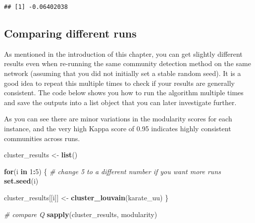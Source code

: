 \documentclass[
]{book}
\newenvironment{Shaded}{\begin{snugshade}}{\end{snugshade}}
\newcommand{\AttributeTok}[1]{\textcolor[rgb]{0.13,0.29,0.53}{#1}}
\newcommand{\CommentTok}[1]{\textcolor[rgb]{0.56,0.35,0.01}{\textit{#1}}}
\newcommand{\ConstantTok}[1]{\textcolor[rgb]{0.56,0.35,0.01}{#1}}
\newcommand{\ControlFlowTok}[1]{\textcolor[rgb]{0.13,0.29,0.53}{\textbf{#1}}}
\newcommand{\DecValTok}[1]{\textcolor[rgb]{0.00,0.00,0.81}{#1}}
\newcommand{\FunctionTok}[1]{\textcolor[rgb]{0.13,0.29,0.53}{\textbf{#1}}}
\newcommand{\NormalTok}[1]{#1}
\newcommand{\OtherTok}[1]{\textcolor[rgb]{0.56,0.35,0.01}{#1}}
\newcommand{\SpecialCharTok}[1]{\textcolor[rgb]{0.81,0.36,0.00}{\textbf{#1}}}
\begin{document}
\begin{Shaded}
\end{Shaded}

\begin{verbatim}
## [1] -0.06402038
\end{verbatim}

\subsection{Comparing different runs}\label{comparing-different-runs}

As mentioned in the introduction of this chapter, you can get slightly different results even when re-running the same community detection method on the same network (assuming that you did not initially set a stable random seed). It is a good idea to repeat this multiple times to check if your results are generally consistent. The code below shows you how to run the algorithm multiple times and save the outputs into a list object that you can later investigate further.

As you can see there are minor variations in the modularity scores for each instance, and the very high Kappa score of 0.95 indicates highly consistent communities across runs.

\begin{Shaded}
\begin{Highlighting}[]
\NormalTok{cluster\_results }\OtherTok{\textless{}{-}} \FunctionTok{list}\NormalTok{()}

\ControlFlowTok{for}\NormalTok{(i }\ControlFlowTok{in} \DecValTok{1}\SpecialCharTok{:}\DecValTok{5}\NormalTok{) \{ }\CommentTok{\# change 5 to a different number if you want more runs }
  \FunctionTok{set.seed}\NormalTok{(i)}
  
\NormalTok{  cluster\_results[[i]] }\OtherTok{\textless{}{-}} \FunctionTok{cluster\_louvain}\NormalTok{(karate\_uu)}
\NormalTok{\}}

\CommentTok{\# compare Q}
\FunctionTok{sapply}\NormalTok{(cluster\_results, modularity)}
\end{Highlighting}
\end{Shaded}
\end{document}
